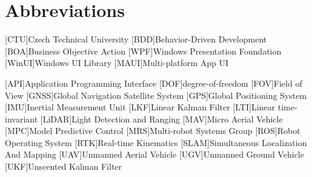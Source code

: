 \section*{Abbreviations}

\begin{acronym}
[CTU]{Czech Technical University}
[BDD]{Behavior-Driven Development}
[BOA]{Business Objective Action}
[WPF]{Windows Presentation Foundation}
[WinUI]{Windows UI Library}
[MAUI]{Multi-platform App UI}

[API]{Application Programming Interface}
[DOF]{degree-of-freedom}
[FOV]{Field of View}
[GNSS]{Global Navigation Satellite System}
[GPS]{Global Positioning System}
[IMU]{Inertial Measurement Unit}
[LKF]{Linear Kalman Filter}
[LTI]{Linear time-invariant}
[LiDAR]{Light Detection and Ranging}
[MAV]{Micro Aerial Vehicle}
[MPC]{Model Predictive Control}
[MRS]{Multi-robot Systems Group}
[ROS]{Robot Operating System}
[RTK]{Real-time Kinematics}
[SLAM]{Simultaneous Localization And Mapping}
[UAV]{Unmanned Aerial Vehicle}
[UGV]{Unmanned Ground Vehicle}
[UKF]{Unscented Kalman Filter}

\end{acronym}
